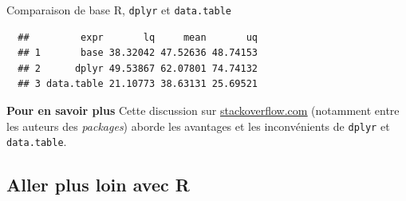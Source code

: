 \documentclass[12pt,handout,ignorenonframetext,]{beamer}
\newenvironment{Shaded}{}{}
\newcommand{\KeywordTok}[1]{\textcolor[rgb]{0.00,0.00,1.00}{#1}}
\newcommand{\DataTypeTok}[1]{#1}
\newcommand{\StringTok}[1]{\textcolor[rgb]{0.00,0.50,0.50}{#1}}
\newcommand{\CommentTok}[1]{\textcolor[rgb]{0.00,0.50,0.00}{#1}}
\newcommand{\OperatorTok}[1]{#1}
\newcommand{\NormalTok}[1]{#1}
\renewenvironment{Shaded}{\begin{snugshade}}{\end{snugshade}}
\begin{document}
\begin{frame}[fragile]{Comparaison de base R, \texttt{dplyr} et
\texttt{data.table}}

\footnotesize

\begin{Shaded}
\end{Shaded}

\vspace{-5mm}

\begin{verbatim}
  ##         expr       lq     mean       uq
  ## 1       base 38.32042 47.52636 48.74153
  ## 2      dplyr 49.53867 62.07801 74.74132
  ## 3 data.table 21.10773 38.63131 25.69521
\end{verbatim}

\normalsize

\textbf{Pour en savoir plus} Cette discussion sur
\href{http://stackoverflow.com/questions/21435339/data-table-vs-dplyr-can-one-do-something-well-the-other-cant-or-does-poorly}{\underline{stackoverflow.com}}
(notamment entre les auteurs des \emph{packages}) aborde les avantages
et les inconvénients de \texttt{dplyr} et \texttt{data.table}.

\end{frame}

\subsection{Aller plus loin avec R}\label{aller-plus-loin-avec-r}
\end{document}
